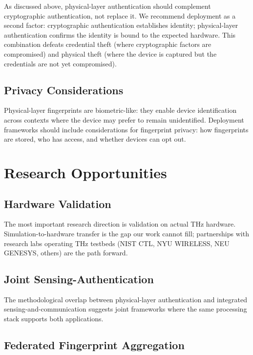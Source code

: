 \documentclass[sigconf,nonacm]{acmart}
\begin{document}
As discussed above, physical-layer authentication should
complement cryptographic authentication, not replace it. We
recommend deployment as a second factor: cryptographic
authentication establishes identity; physical-layer
authentication confirms the identity is bound to the expected
hardware. This combination defeats credential theft (where
cryptographic factors are compromised) and physical theft (where
the device is captured but the credentials are not yet
compromised).

\subsection{Privacy Considerations}

Physical-layer fingerprints are biometric-like: they enable
device identification across contexts where the device may
prefer to remain unidentified. Deployment frameworks should
include considerations for fingerprint privacy: how
fingerprints are stored, who has access, and whether devices
can opt out.

\section{Research Opportunities}

\subsection{Hardware Validation}

The most important research direction is validation on actual
THz hardware. Simulation-to-hardware transfer is the gap our
work cannot fill; partnerships with research labs operating
THz testbeds (NIST CTL, NYU WIRELESS, NEU GENESYS, others) are
the path forward.

\subsection{Joint Sensing-Authentication}

The methodological overlap between physical-layer authentication
and integrated sensing-and-communication suggests joint
frameworks where the same processing stack supports both
applications.

\subsection{Federated Fingerprint Aggregation}
\end{document}
